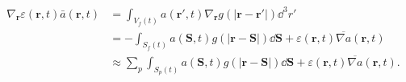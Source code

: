 \begin{equation}
\begin{align*}
\nabla_{\mathbf{r}} \varepsilon (\mathbf{r},t) \bar{a}(\mathbf{r},t) 
&=
\int_{V_f(t)}{
a(\mathbf{r'}, t) \nabla_{\mathbf{r}} g(|\mathbf{r} - \mathbf{r'}| )  \dd^3 r'} \\
&=
- \int_{S_f(t)}{ a(\mathbf{S},t) g(|\mathbf{r} - \mathbf{S}|) \dd \mathbf{S} + 
\varepsilon (\mathbf{r},t) \overline{\nabla a}(\mathbf{r},t)} \\
& \approx
\sum_{p}{\int_{S_p(t)}{ a(\mathbf{S},t) g(|\mathbf{r} - \mathbf{S}|)  \dd
\mathbf{S}}} + \varepsilon (\mathbf{r},t) \overline{\nabla a}(\mathbf{r},t).
\end{align*}
 \label{eq:divepsa}
\end{equation}
